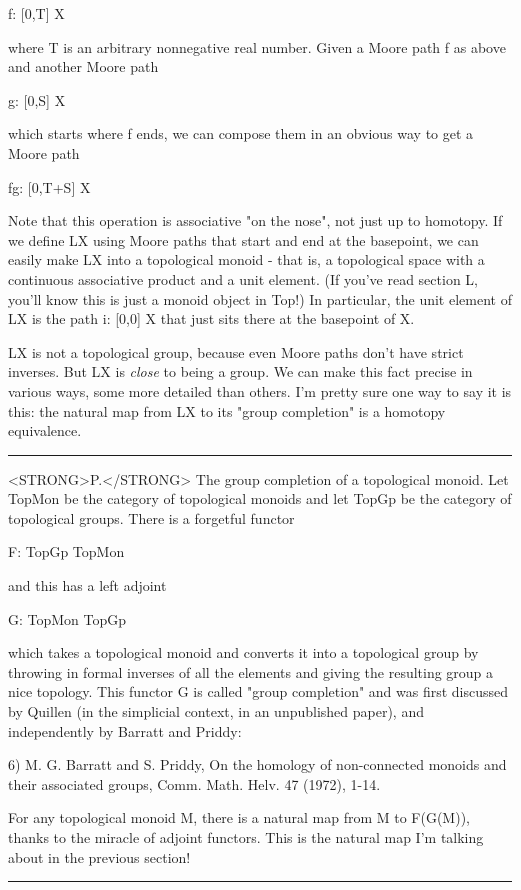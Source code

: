 f: [0,T] \to  X

where T is an arbitrary nonnegative real number.  Given a Moore path
f as above and another Moore path

g: [0,S] \to  X

which starts where f ends, we can compose them in an obvious way to
get a Moore path

fg: [0,T+S] \to  X

Note that this operation is associative "on the nose", not just up to
homotopy.  If we define LX using Moore paths that start and end at the
basepoint, we can easily make LX into a topological monoid - that is,
a topological space with a continuous associative product and a unit
element.  (If you've read section L, you'll know this is just a monoid
object in Top!)  In particular, the unit element of LX is the path 
i: [0,0] \to  X that just sits there at the basepoint of X.

LX is not a topological group, because even Moore paths don't have
strict inverses.  But LX is \emph{close} to being a group.  We can make
this fact precise in various ways, some more detailed than others.
I'm pretty sure one way to say it is this: the natural map from LX to
its "group completion" is a homotopy equivalence.

\par\noindent\rule{\textwidth}{0.4pt}
<STRONG>P.</STRONG>  The group completion of a topological monoid.  Let TopMon be the
category of topological monoids and let TopGp be the category of
topological groups.  There is a forgetful functor

F: TopGp \to  TopMon

and this has a left adjoint

G: TopMon \to  TopGp

which takes a topological monoid and converts it into a topological
group by throwing in formal inverses of all the elements and giving
the resulting group a nice topology.  This functor G is called "group
completion" and was first discussed by Quillen (in the simplicial
context, in an unpublished paper), and independently by Barratt and
Priddy:

6) M. G. Barratt and S. Priddy, On the homology of non-connected
monoids and their associated groups, Comm. Math. Helv. 47 (1972),
1-14.

For any topological monoid M, there is a natural map from M to
F(G(M)), thanks to the miracle of adjoint functors.  This is the
natural map I'm talking about in the previous section!






\par\noindent\rule{\textwidth}{0.4pt}


